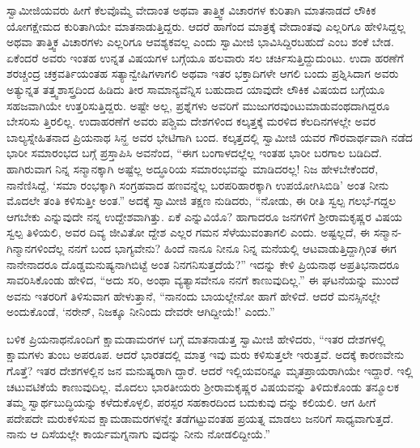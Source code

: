 ಸ್ವಾಮೀಜಿಯವರು ಹೀಗೆ ಕೆಲವೊಮ್ಮೆ ವೇದಾಂತ ಅಥವಾ ತಾತ್ತ್ವಿಕ ವಿಚಾರಗಳ ಕುರಿತಾಗಿ ಮಾತನಾಡದೆ ಲೌಕಿಕ ಯೋಗಕ್ಷೇಮದ ಕುರಿತಾಗಿಯೇ ಮಾತನಾಡುತ್ತಿದ್ದರು. ಆದರೆ ಹಾಗೆಂದ ಮಾತ್ರಕ್ಕೆ ವೇದಾಂತವು ಎಲ್ಲರಿಗೂ ಹೇಳಿಸಿದ್ದಲ್ಲ ಅಥವಾ ತಾತ್ತ್ವಿಕ ವಿಚಾರಗಳು ಎಲ್ಲರಿಗೂ ಆವಶ್ಯಕವಲ್ಲ ಎಂದು ಸ್ವಾಮೀಜಿ ಭಾವಿಸಿದ್ದಿರಬಹುದೆ ಎಂಬ ಶಂಕೆ ಬೇಡ. ಏಕೆಂದರೆ ಅವರು ಇಂತಹ ಉನ್ನತ ವಿಷಯಗಳ ಬಗ್ಗೆಯೂ ಹಲವಾರು ಸಲ ಚರ್ಚಿಸುತ್ತಿದ್ದುದುಂಟು. ಉದಾ ಹರಣೆಗೆ ಶರಚ್ಚಂದ್ರ ಚಕ್ರವರ್ತಿಯಂತಹ ಸತ್ಯಾನ್ವೇಷಿಗಳಾಗಲಿ ಅಥವಾ ಇತರ ಭಕ್ತಾದಿಗಳೇ ಆಗಲಿ ಬಂದು ಪ್ರಶ್ನಿಸಿದಾಗ ಅವರು ಅತ್ಯುನ್ನತ ತತ್ತ್ವಶಾಸ್ತ್ರದಿಂದ ಹಿಡಿದು ತೀರ ಸಾಮಾನ್ಯವೆನ್ನಿಸ ಬಹುದಾದ ಯಾವುದೇ ಲೌಕಿಕ ವಿಷಯದ ಬಗ್ಗೆಯೂ ಸಹಜವಾಗಿಯೇ ಉತ್ತರಿಸುತ್ತಿದ್ದರು. ಅಷ್ಟೇ ಅಲ್ಲ, ಪ್ರಶ್ನೆಗಳು ಅವರಿಗೆ ಮುಜುಗರವುಂಟುಮಾಡುವಂಥದಾಗಿದ್ದರೂ ಬೇಸರಿಸು ತ್ತಿರಲಿಲ್ಲ. ಉದಾಹರಣೆಗೆ ಅವರು ಪಶ್ಚಿಮ ದೇಶಗಳಿಂದ ಕಲ್ಕತ್ತಕ್ಕೆ ಮರಳಿದ ಕೆಲದಿನಗಳಲ್ಲೇ ಅವರ ಬಾಲ್ಯಸ್ನೇಹಿತನಾದ ಪ್ರಿಯನಾಥ ಸಿನ್ಹ ಅವರ ಭೇಟಿಗಾಗಿ ಬಂದ. ಕಲ್ಕತ್ತದಲ್ಲಿ ಸ್ವಾಮೀಜಿ ಯವರ ಗೌರವಾರ್ಥವಾಗಿ ನಡೆದ ಭಾರೀ ಸಮಾರಂಭದ ಬಗ್ಗೆ ಪ್ರಸ್ತಾಪಿಸಿ ಅವನೆಂದ, “ಈಗ ಬಂಗಾಳದಲ್ಲೆಲ್ಲ ಇಂತಹ ಭಾರೀ ಬರಗಾಲ ಬಡಿದಿದೆ. ಹಾಗಿರುವಾಗ ನಿನ್ನ ಸನ್ಮಾನಕ್ಕಾಗಿ ಅಷ್ಟೆಲ್ಲ ಅದ್ಧೂರಿಯ ಸಮಾರಂಭವನ್ನು ಮಾಡಿದರಲ್ಲ! ನಿಜ ಹೇಳಬೇಕೆಂದರೆ, ನಾನೆಣಿಸಿದ್ದೆ, ‘ಸಮಾ ರಂಭಕ್ಕಾಗಿ ಸಂಗ್ರಹವಾದ ಹಣವನ್ನೆಲ್ಲ ಬರಪರಿಹಾರಕ್ಕಾಗಿ ಉಪಯೋಗಿಸಿಬಿಡಿ’ ಅಂತ ನೀನು ಮೊದಲೇ ತಂತಿ ಕಳಿಸುತ್ತೀ ಅಂತ.” ಅದಕ್ಕೆ ಸ್ವಾಮೀಜಿ ತಕ್ಷಣ ನುಡಿದರು, “ನೋಡು, ಈ ರೀತಿ ಸ್ವಲ್ಪ ಗಲಭೆ-ಗದ್ದಲ ಆಗಬೇಕು ಎನ್ನುವುದೇ ನನ್ನ ಉದ್ದೇಶವಾಗಿತ್ತು. ಏಕೆ ಎನ್ನುವಿಯೊ? ಹಾಗಾದರೂ ಜನಗಳಿಗೆ ಶ್ರೀರಾಮಕೃಷ್ಣರ ವಿಷಯ ಸ್ವಲ್ಪ ತಿಳಿಯಲಿ, ಅವರ ದಿವ್ಯ ಜೀವಿತೋ ದ್ದೇಶ ಎಲ್ಲರ ಗಮನ ಸೆಳೆಯುವಂತಾಗಲಿ ಎಂದು. ಅಷ್ಟಲ್ಲದೆ, ಈ ಸನ್ಮಾನ-ಗಿನ್ಮಾನಗಳಿಂದೆಲ್ಲ ನನಗೆ ಬಂದ ಭಾಗ್ಯವೇನು? ಹಿಂದೆ ನಾನೂ ನೀನೂ ನಿನ್ನ ಮನೆಯಲ್ಲಿ ಆಟವಾಡುತ್ತಿದ್ದಾಗ್ಗಿಂತ ಈಗ ನಾನೇನಾದರೂ ದೊಡ್ಡಮನುಷ್ಯನಾಗಿಬಿಟ್ಟೆ ಅಂತ ನಿನಗನಿಸುತ್ತದೆಯೆ?” ಇದನ್ನು ಕೇಳಿ ಪ್ರಿಯನಾಥ ಅಪ್ರತಿಭನಾದರೂ ಸಾವರಿಸಿಕೊಂಡು ಹೇಳಿದ, “ಅದು ಸರಿ, ಅಂಥಾ ವ್ಯತ್ಯಾಸವೇನೂ ನನಗೆ ಕಾಣುವುದಿಲ್ಲ.” ಈ ಘಟನೆಯನ್ನು ಮುಂದೆ ಅವನು ಇತರರಿಗೆ ತಿಳಿಸುವಾಗ ಹೇಳುತ್ತಾನೆ, “ನಾನಂದು ಬಾಯಲ್ಲೇನೋ ಹಾಗೆ ಹೇಳಿದೆ. ಆದರೆ ಮನಸ್ಸಿನಲ್ಲೇ ಅಂದುಕೊಂಡೆ, ‘ನರೇನ್, ನಿಜಕ್ಕೂ ನೀನಿಂದು ದೇವರೇ ಆಗಿದ್ದೀಯೆ!’ ಎಂದು.”

ಬಳಿಕ ಪ್ರಿಯನಾಥನೊಂದಿಗೆ ಕ್ಷಾಮಡಾಮರಗಳ ಬಗ್ಗೆ ಮಾತನಾಡುತ್ತ ಸ್ವಾಮೀಜಿ ಹೇಳಿದರು, “ಇತರ ದೇಶಗಳಲ್ಲಿ ಕ್ಷಾಮಗಳು ತುಂಬ ಅಪರೂಪ. ಆದರೆ ಭಾರತದಲ್ಲಿ ಮಾತ್ರ ಇವು ಮರು ಕಳಿಸುತ್ತಲೇ ಇರುತ್ತವೆ. ಅದಕ್ಕೆ ಕಾರಣವೇನು ಗೊತ್ತೆ? ಇತರ ದೇಶಗಳಲ್ಲಿನ ಜನ ಮನುಷ್ಯರಾಗಿ ದ್ದಾರೆ. ಆದರೆ ಇಲ್ಲಿಯವರಿನ್ನೂ ಮೃತಪ್ರಾಯರಾಗಿಯೇ ಇದ್ದಾರೆ. ಇಲ್ಲಿ ಚಟುವಟಿಕೆಯೆ ಕಾಣುವುದಿಲ್ಲ. ಮೊದಲು ಭಾರತೀಯರು ಶ್ರೀರಾಮಕೃಷ್ಣರ ವಿಷಯವನ್ನು ತಿಳಿದುಕೊಂಡು ತನ್ಮೂಲಕ ತಮ್ಮ ಸ್ವಾರ್ಥಬುದ್ಧಿಯನ್ನು ಕಳೆದುಕೊಳ್ಳಲಿ, ಪರಸ್ಪರ ಸಹಕಾರದಿಂದ ಬದುಕುವು ದನ್ನು ಕಲಿಯಲಿ. ಆಗ ಹೀಗೆ ಪದೇಪದೇ ಮರುಕಳಿಸುವ ಕ್ಷಾಮಡಾಮರಗಳನ್ನೇ ತಡೆಗಟ್ಟುವಂತಹ ಪ್ರಯತ್ನ ಮಾಡಲು ಜನರಿಗೆ ಸಾಧ್ಯವಾಗುತ್ತದೆ. ನಾನು ಆ ದಿಸೆಯಲ್ಲೇ ಕಾರ್ಯಮಗ್ನನಾಗು ವುದನ್ನು ನೀನು ನೋಡಲಿದ್ದೀಯೆ.”


